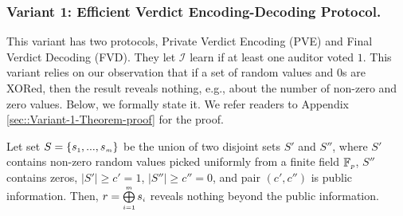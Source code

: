 \subsubsection{Variant 1:  Efficient Verdict  Encoding-Decoding Protocol.}




This variant has two protocols,  Private Verdict Encoding (PVE) and Final Verdict Decoding (FVD). They let $\mathcal{I}$ learn if at least one auditor voted $1$. This variant relies on our observation that if a set of random values and $0$s are XORed, then the result reveals nothing, e.g.,  about the number of non-zero and zero values. Below, we formally state it.  We refer readers to Appendix \ref{sec::Variant-1-Theorem-proof} for the proof.







\begin{theorem}\label{set-xor}
Let set $S=\{s_{\scriptscriptstyle 1},..., s_{\scriptscriptstyle m}\}$ be the union of  two disjoint sets $S'$ and $S''$, where $S'$ contains non-zero random values picked uniformly  from a finite field $\mathbb{F}_{\scriptscriptstyle p}$, $S''$ contains zeros, $|S'|\geq c'=1$, $|S''|\geq c''=0$, and pair $(c',c'')$ is public information. Then, $r= \bigoplus\limits^{\scriptscriptstyle m}_{\scriptscriptstyle i=1} s_{\scriptscriptstyle i}$ reveals nothing beyond the public information.  
\end{theorem}



